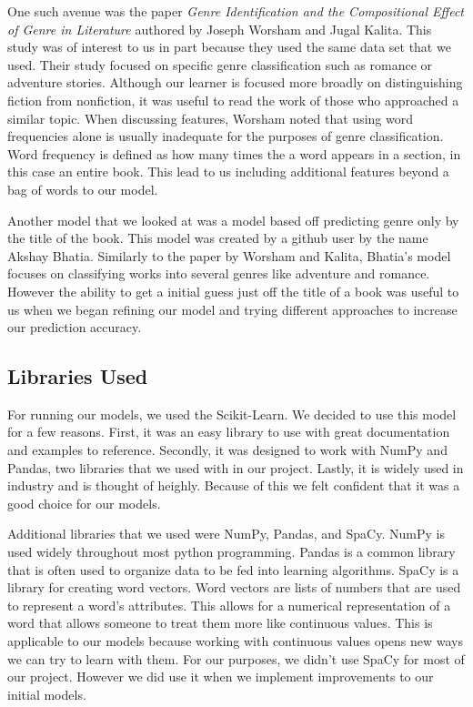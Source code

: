 \documentclass{article}
\begin{document}
One such avenue was the paper \textit{Genre Identification and the Compositional Effect of Genre in Literature} authored by Joseph Worsham and Jugal Kalita. This study was of interest to us in part because they used the same data set that we used. Their study focused on specific genre classification such as romance or adventure stories. Although our learner is focused more broadly on distinguishing fiction from nonfiction, it was useful to read the work of those who approached a similar topic. When discussing features, Worsham noted that using word frequencies alone is usually inadequate for the purposes of genre classification. Word frequency is defined as how many times the a word appears in a section, in this case an entire book. This lead to us including additional features beyond a bag of words to our model. \par
Another model that we looked at was a model based off predicting genre only by the title of the book. This model was created by a github user by the name Akshay Bhatia. Similarly to the paper by Worsham and Kalita, Bhatia’s model focuses on classifying works into several genres like adventure and romance.  However the ability to get a initial guess just off the title of a book was useful to us when we began refining our model and trying different approaches to increase our prediction accuracy.\par

\subsection{Libraries Used}

	For running our models, we used the Scikit-Learn. We decided to use this model for a few reasons. First, it was an easy library to use with great documentation and examples to reference. Secondly, it was designed to work with NumPy and Pandas, two libraries that we used with in our project. Lastly, it is widely used in industry and is thought of heighly. Because of this we felt confident that it was a good choice for our models. \par
Additional libraries that we used were NumPy, Pandas, and SpaCy. NumPy is used widely throughout most python programming. Pandas is a common library that is often used to organize data to be fed into learning algorithms. SpaCy is a library for creating word vectors. Word vectors are lists of numbers that are used to represent a word’s attributes. This allows for a numerical representation of a word that allows someone to treat them more like continuous values. This is applicable to our models because working with continuous values opens new ways we can try to learn with them. For our purposes, we didn’t use SpaCy for most of our project. However we did use it when we implement improvements to our initial models.
\end{document}
